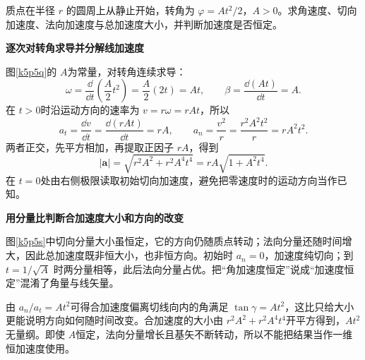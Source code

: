 \begin{question}\begin{example}[角加速度恒定的圆周运动]\label{k5p5}
质点在半径 $r$ 的圆周上从静止开始，转角为 $\varphi=At^2/2$，$A>0$。求角速度、切向加速度、法向加速度与总加速度大小，并判断加速度是否恒定。\end{example}
\end{question}
\begin{solution}\textbf{逐次对转角求导并分解线加速度}\par\nobreak
图\ref{k5p5q}的 $A$为常量，对转角连续求导：
\[
 \omega=\frac{\dd}{\dd t}\left(\frac A2t^2\right)
 =\frac A2(2t)=At,\qquad
 \beta=\frac{\dd(At)}{\dd t}=A.
\]
在 $t>0$时沿运动方向的速率为 $v=r\omega=rAt$，所以
\[
 a_t=\frac{\dd v}{\dd t}=\frac{\dd(rAt)}{\dd t}=\boxed{rA},
 \qquad a_n=\frac{v^2}{r}=\frac{r^2A^2t^2}{r}=\boxed{rA^2t^2}.
\]
两者正交，先平方相加，再提取正因子 $rA$，得到
\[
 |\bm a|=\sqrt{r^2A^2+r^2A^4t^4}
 =\boxed{rA\sqrt{1+A^2t^4}}.
\]
在 $t=0$处由右侧极限读取初始切向加速度，避免把零速度时的运动方向当作已知。



\par\medskip{}\noindent\textbf{用分量比判断合加速度大小和方向的改变}\par\nobreak
图\ref{k5p5s}中切向分量大小虽恒定，它的方向仍随质点转动；法向分量还随时间增大，因此总加速度既非恒大小，也非恒方向。初始时 $a_n=0$，加速度纯切向；到 $t=1/\sqrt A$ 时两分量相等，此后法向分量占优。把“角加速度恒定”说成“加速度恒定”混淆了角量与线矢量。

由 $a_n/a_t=At^2$可得合加速度偏离切线向内的角满足 $\tan\gamma=At^2$，这比只给大小更能说明方向如何随时间改变。合加速度的大小由 $r^2A^2+r^2A^4t^4$开平方得到，$At^2$无量纲。即使 $A$恒定，法向分量增长且基矢不断转动，所以不能把结果当作一维恒加速度使用。\end{solution}

